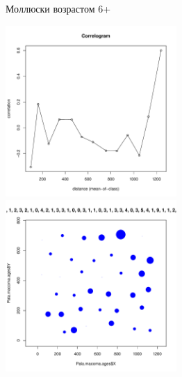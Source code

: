 	\begin{figure}[h]

	\begin{minipage}[b]{\linewidth}
	\begin{center}
		Моллюски возрастом 6+
	\end{center}
	\end{minipage}
	
	\begin{minipage}[b]{.46\linewidth}
	\begin{center}
		\includegraphics[width=65mm]{../Barenc_Sea/distribution_Moran/Pala_macoma_age_N6_.pdf}
	\end{center}
	\end{minipage}
	\hfil %
	\begin{minipage}[b]{.46\linewidth}
	\begin{center}
		\includegraphics[width=65mm]{../Barenc_Sea/distribution_Moran/Pala_macoma_age_bubb_N6_.pdf}
	\end{center}
	\end{minipage}


\end{figure}
